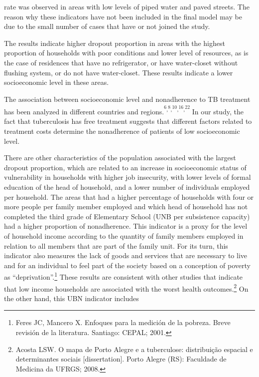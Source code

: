 \begin{multicols}{2}
rate was observed in areas with low levels of piped water and paved streets.\allowbreak{} The reason why these indicators have not been included in the final model may be due to the small number of cases that have or not joined the study.\allowbreak{}\par{}The results indicate higher dropout proportion in areas with the highest proportion of households with poor conditions and lower level of resources,\allowbreak{} as is the case of residences that have no refrigerator,\allowbreak{} or have water-\allowbreak{}closet without flushing system,\allowbreak{} or do not have water-\allowbreak{}closet.\allowbreak{} These results indicate a lower socioeconomic level in these areas.\allowbreak{}\par{}The association between socioeconomic level and nonadherence to TB treatment has been analyzed in different countries and regions.\allowbreak{}\textsuperscript{\textsuperscript{6}}\textsuperscript{,\allowbreak{}}\textsuperscript{\textsuperscript{8}}\textsuperscript{,\allowbreak{}}\textsuperscript{\textsuperscript{10}}\textsuperscript{,\allowbreak{}}\textsuperscript{\textsuperscript{16}}\textsuperscript{,\allowbreak{}}\textsuperscript{\textsuperscript{22}} In our study,\allowbreak{} the fact that tuberculosis has free treatment suggests that different factors related to treatment costs determine the nonadherence of patients of low socioeconomic level.\allowbreak{}\par{}There are other characteristics of the population associated with the largest dropout proportion,\allowbreak{} which are related to an increase in socioeconomic status of vulnerability in households with higher job insecurity,\allowbreak{} with lower levels of formal education of the head of household,\allowbreak{} and a lower number of individuals employed per household.\allowbreak{} The areas that had a higher percentage of households with four or more people per family member employed and which head of household has not completed the third grade of Elementary School (\allowbreak{}UNB per subsistence capacity)\allowbreak{} had a higher proportion of nonadherence.\allowbreak{} This indicator is a proxy for the level of household income according to the quantity of family members employed in relation to all members that are part of the family unit.\allowbreak{} For its turn,\allowbreak{} this indicator also measures the lack of goods and services that are necessary to live and for an individual to feel part of the society based on a conception of poverty as “deprivation”.\allowbreak{}\protect\footnote{ Feres JC,\allowbreak{} Mancero X.\allowbreak{} Enfoques para la medición de la pobreza.\allowbreak{} Breve revisión de la literatura.\allowbreak{} Santiago:\allowbreak{} CEPAL; 2001.\allowbreak{}} These results are consistent with other studies that indicate that low income households are associated with the worst health outcomes.\allowbreak{}\protect\footnote{ Acosta LSW.\allowbreak{} O mapa de Porto Alegre e a tuberculose:\allowbreak{} distribuição espacial e determinantes sociais [dissertation].\allowbreak{} Porto Alegre (\allowbreak{}RS)\allowbreak{}:\allowbreak{} Faculdade de Medicina da UFRGS; 2008.\allowbreak{}} On the other hand,\allowbreak{} this UBN indicator includes 
\end{multicols}
